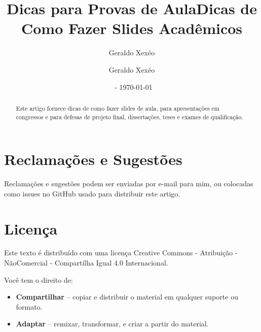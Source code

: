 \documentclass[12pt,a4paper]{article}
\title{Dicas para Provas de Aula}
\author{Geraldo Xexéo}
\affil{\url{xexeo@ufrj.br} \\
    \url{http://xexeo.net}}
\date{\ccbyncsa\  - \today}
\author{Geraldo Xexéo}
\title{Dicas de Como Fazer Slides Acadêmicos}
\begin{document}
\maketitle

\begin{abstract}
    Este artigo fornece dicas de como fazer slides de aula, para apresentações em congressos e para defesas de projeto final, dissertações, teses e exames de qualificação.
\end{abstract}

\tableofcontents














\section*{Reclamações e Sugestões}

Reclamações e sugestões podem ser enviadas por e-mail para mim, ou colocadas como issues no GitHub usado para distribuir este artigo.

\section*{Licença}


Este texto é distribuído com uma licença Creative Commons - Atribuição - NãoComercial - Compartilha Igual 4.0 Internacional.




\begin{center}
   \ccbyncsa
\end{center}

Você tem o direito de:
\begin{itemize}
    \item \textbf{Compartilhar} -- copiar e distribuir o material em qualquer suporte ou formato.
    \item \textbf{Adaptar} -- remixar, transformar, e criar a partir do material.
\end{itemize}
\end{document}
